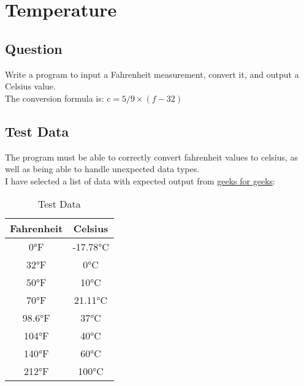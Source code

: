 \section{Temperature}
    \subsection*{Question}
    Write a program to input a Fahrenheit measurement, convert it, and output a Celsius value.\\
    The conversion formula is: \(c = 5 / 9 \times (f - 32)\)

    \subsection*{Test Data}
        The program must be able to correctly convert fahrenheit values to celsius,
        as well as being able to handle unexpected data types.\\

        I have selected a list of data with expected output from \href{https://www.geeksforgeeks.org/fahrenheit-to-celsius-formula/}{geeks for geeks}:
        \begin{table}[H]
            \centering
            \begin{tabular}{c c}
                \hline
                \textbf{Fahrenheit} & \textbf{Celsius} \\
                \hline
                0°F & -17.78°C \\
                32°F & 0°C \\
                50°F & 10°C \\
                70°F & 21.11°C \\
                98.6°F & 37°C \\
                104°F & 40°C \\
                140°F & 60°C \\
                212°F & 100°C \\
                \hline
            \end{tabular}
            \caption{Test Data}
        \end{table}
